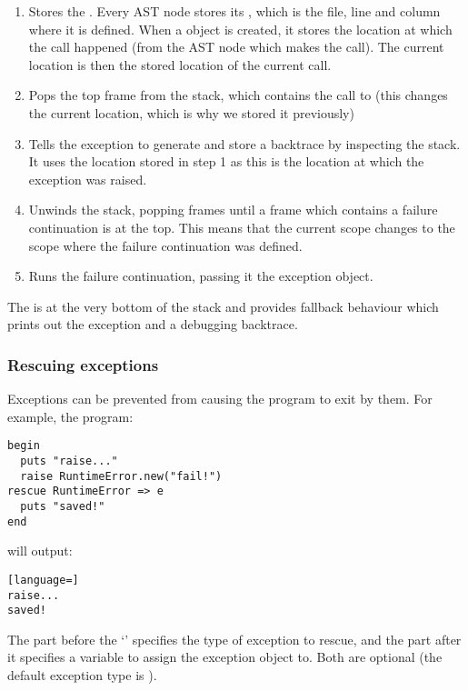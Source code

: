 \begin{enumerate}
  \item Stores the . Every AST node stores its , which is the file, line and column where it is defined. When a  object is created, it stores the location at which the call happened (from the AST node which makes the call). The current location is then the stored location of the current call.
  
  \item Pops the top frame from the stack, which contains the call to  (this changes the current location, which is why we stored it previously)
  
  \item Tells the exception to generate and store a backtrace by inspecting the stack. It uses the location stored in step 1 as this is the location at which the exception was raised.
  
  \item Unwinds the stack, popping frames until a frame which contains a failure continuation is at the top. This means that the current scope changes to the scope where the failure continuation was defined.
  
  \item Runs the failure continuation, passing it the exception object.
\end{enumerate}

The  is at the very bottom of the stack and provides fallback behaviour which prints out the exception and a debugging backtrace.

\subsubsection{Rescuing exceptions}

Exceptions can be prevented from causing the program to exit by  them. For example, the program:

\begin{lstlisting}
begin
  puts "raise..."
  raise RuntimeError.new("fail!")
rescue RuntimeError => e
  puts "saved!"
end
\end{lstlisting}

will output:

\begin{lstlisting}[language=]
raise...
saved!
\end{lstlisting}

The part before the `\code{=>}' specifies the type of exception to rescue, and the part after it specifies a variable to assign the exception object to. Both are optional (the default exception type is ).

